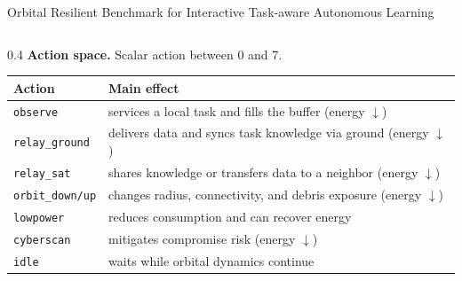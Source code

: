 \documentclass[aspectratio=169]{beamer}
\begin{document}
\begin{frame}{Orbital Resilient Benchmark for
    Interactive Task-aware Autonomous Learning}
\begin{columns}[c,totalwidth=\textwidth]
\begin{column}{0.4\textwidth}
      \vspace{0.4cm}
      \textbf{Action space.} Scalar action between 0 and 7.
      \begin{tabularx}{1.2\linewidth}{p{1.09cm} X}
        \toprule
        Action                  & Main effect                                                             \\
        \midrule
        \texttt{observe}        & services a local task and fills the buffer (energy $\downarrow$)        \\
        \texttt{relay\_ground}  & delivers data and syncs task knowledge via ground (energy $\downarrow$) \\
        \texttt{relay\_sat}     & shares knowledge or transfers data to a neighbor (energy $\downarrow$)  \\
        \texttt{orbit\_down/up} & changes radius, connectivity, and debris exposure (energy $\downarrow$) \\
        \texttt{lowpower}       & reduces consumption and can recover energy                              \\
        \texttt{cyberscan}      & mitigates compromise risk (energy $\downarrow$)                         \\
        \texttt{idle}           & waits while orbital dynamics continue                                   \\
        \bottomrule
      \end{tabularx}
    \end{column}
    \vspace{-0.5cm}
  \end{columns}

\end{frame}
\end{document}
